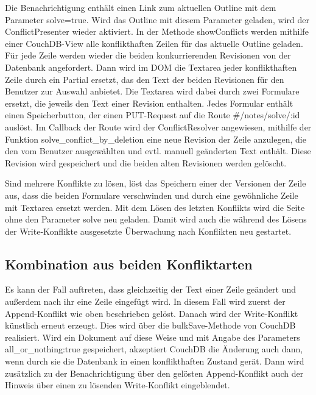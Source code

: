 Die Benachrichtigung enthält einen Link zum aktuellen Outline mit dem Parameter {\selectfont solve=true}. Wird das Outline mit diesem Parameter geladen, wird der {\selectfont ConflictPresenter} wieder aktiviert. In der Methode {\selectfont showConflicts} werden mithilfe einer CouchDB-View alle konflikthaften Zeilen für das aktuelle Outline geladen. Für jede Zeile werden wieder die beiden konkurrierenden Revisionen von der Datenbank angefordert. Dann wird im DOM die Textarea jeder konflikthaften Zeile durch ein Partial ersetzt, das den Text der beiden Revisionen für den Benutzer zur Auswahl anbietet. Die Textarea wird dabei durch zwei Formulare ersetzt, die jeweils den Text einer Revision enthalten. Jedes Formular enthält einen Speicherbutton, der einen {\selectfont PUT}-Request auf die Route {\selectfont\#/notes/solve/:id} auslöst. Im Callback der Route wird der {\selectfont ConflictResolver} angewiesen, mithilfe der Funktion {\selectfont solve\_conflict\_by\_deletion} eine neue Revision der Zeile anzulegen, die den vom Benutzer ausgewählten und evtl. manuell geänderten Text enthält. Diese Revision wird gespeichert und die beiden alten Revisionen werden gelöscht. 

Sind mehrere Konflikte zu lösen, löst das Speichern einer der Versionen der Zeile aus, dass die beiden Formulare verschwinden und durch eine gewöhnliche Zeile mit Textarea ersetzt werden. Mit dem Lösen des letzten Konflikts wird die Seite ohne den Parameter {\selectfont solve} neu geladen. Damit wird auch die während des Lösens der Write-Konflikte ausgesetzte Überwachung nach Konflikten neu gestartet.




\subsection{Kombination aus beiden Konfliktarten}

Es kann der Fall auftreten, dass gleichzeitig der Text einer Zeile geändert und außerdem nach ihr eine Zeile eingefügt wird. In diesem Fall wird zuerst der Append-Konflikt wie oben beschrieben gelöst. Danach wird der Write-Konflikt künstlich erneut erzeugt. Dies wird über die {\selectfont bulkSave}-Methode von CouchDB realisiert. Wird ein Dokument auf diese Weise und mit Angabe des Parameters {\selectfont all\_or\_nothing:true} gespeichert, akzeptiert CouchDB die Änderung auch dann, wenn durch sie die Datenbank in einen konflikthaften Zustand gerät. Dann wird zusätzlich zu der Benachrichtigung über den gelösten Append-Konflikt auch der Hinweis über einen zu lösenden Write-Konflikt eingeblendet. 


